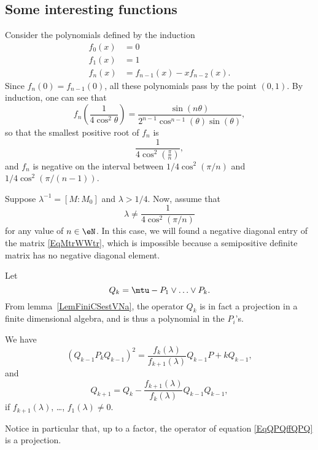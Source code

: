 					\subsection{Some interesting functions}

Consider the polynomials defined by the induction
\begin{subequations}
\begin{align}
	f_0(x)&=0	\\
	f_1(x)&=1	\\
	f_n(x)&=f_{n-1}(x)-xf_{n-2}(x).
\end{align}
\end{subequations}
Since $f_n(0)=f_{n-1}(0)$, all these polynomials pass by the point $(0,1)$. By induction, one can see that
\begin{equation}
	f_n\left( \frac{1}{ 4\cos^2\theta } \right)=\frac{\sin(n\theta)}{2^{n-1}\cos^{n-1}(\theta)\sin(\theta)},
\end{equation}
so that	the smallest positive root of $f_n$ is
\begin{equation}
	\frac{1}{ 4\cos^2\left( \frac{ \pi }{ n } \right) },
\end{equation}
and $f_n$ is negative on the interval between $1/4\cos^2(\pi/n)$ and $1/4\cos^2(\pi/(n-1))$.

Suppose $\lambda^{-1}=[M:M_0]$ and $\lambda>1/4$. Now, assume that
\begin{equation}
	\lambda\neq \frac{1}{ 4\cos^{2}(\pi/n) }
\end{equation}
for any value of $n\in\eN$. In this case, we will found a negative diagonal entry of the matrix \eqref{EqMtrWWtr}, which is impossible because a semipositive definite matrix has no negative diagonal element.

Let
\begin{equation}
	Q_k=\mtu-P_1\vee\ldots\vee P_k.
\end{equation}
From lemma~\ref{LemFiniCSestVNa}, the operator $Q_k$ is in fact a projection in a finite dimensional algebra, and is thus a polynomial in the $P_i$'s.

\begin{lemma}
	We have
\begin{equation}		\label{EqQPQffQPQ}
	(Q_{k-1}P_kQ_{k-1})^2=\frac{ f_k(\lambda) }{ f_{k+1}(\lambda) }Q_{k-1}P+kQ_{k-1},
\end{equation}
and
\begin{equation}
	Q_{k+1}=Q_k-\frac{ f_{k+1}(\lambda) }{ f_k(\lambda) }Q_{k-1}Q_{k-1},
\end{equation}
if $f_{k+1}(\lambda)$, \ldots, $f_1(\lambda)\neq0$.
\end{lemma}
Notice in particular that, up to a factor, the operator of equation \eqref{EqQPQffQPQ} is a projection.

